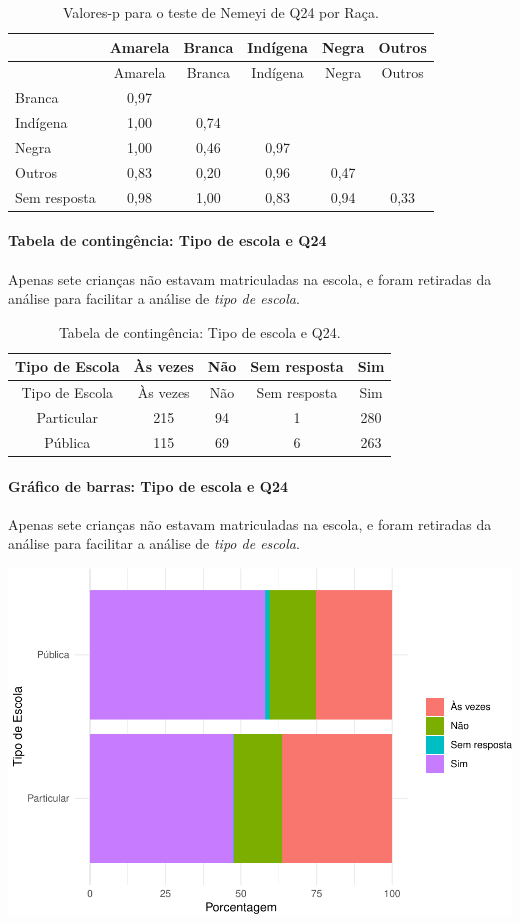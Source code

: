 \documentclass[]{article}
\let\oldparagraph\paragraph
\renewcommand{\paragraph}[1]{\oldparagraph{#1}\mbox{}}
\begin{document}
\begin{longtable}[]{@{}lccccc@{}}
\caption{\label{tab:unnamed-chunk-642}Valores-p para o teste de Nemeyi de Q24 por Raça.}\tabularnewline
\toprule
& Amarela & Branca & Indígena & Negra & Outros\tabularnewline
\midrule
\endfirsthead
\toprule
& Amarela & Branca & Indígena & Negra & Outros\tabularnewline
\midrule
\endhead
Branca & 0,97 & & & &\tabularnewline
Indígena & 1,00 & 0,74 & & &\tabularnewline
Negra & 1,00 & 0,46 & 0,97 & &\tabularnewline
Outros & 0,83 & 0,20 & 0,96 & 0,47 &\tabularnewline
Sem resposta & 0,98 & 1,00 & 0,83 & 0,94 & 0,33\tabularnewline
\bottomrule
\end{longtable}

\cleardoublepage

\hypertarget{tabela-de-continguxeancia-tipo-de-escola-e-q24}{%
\paragraph{Tabela de contingência: Tipo de escola e Q24}\label{tabela-de-continguxeancia-tipo-de-escola-e-q24}}

Apenas sete crianças não estavam matriculadas na escola, e foram retiradas da análise para facilitar a análise de \emph{tipo de escola}.

\begin{longtable}[]{@{}ccccc@{}}
\caption{\label{tab:unnamed-chunk-643}Tabela de contingência: Tipo de escola e Q24.}\tabularnewline
\toprule
Tipo de Escola & Às vezes & Não & Sem resposta & Sim\tabularnewline
\midrule
\endfirsthead
\toprule
Tipo de Escola & Às vezes & Não & Sem resposta & Sim\tabularnewline
\midrule
\endhead
Particular & 215 & 94 & 1 & 280\tabularnewline
Pública & 115 & 69 & 6 & 263\tabularnewline
\bottomrule
\end{longtable}

\hypertarget{gruxe1fico-de-barras-tipo-de-escola-e-q24}{%
\paragraph{Gráfico de barras: Tipo de escola e Q24}\label{gruxe1fico-de-barras-tipo-de-escola-e-q24}}

Apenas sete crianças não estavam matriculadas na escola, e foram retiradas da análise para facilitar a análise de \emph{tipo de escola}.

\begin{center}\includegraphics[width=0.75\linewidth]{relatorio_covid19_files/figure-latex/unnamed-chunk-644-1} \end{center}
\end{document}
